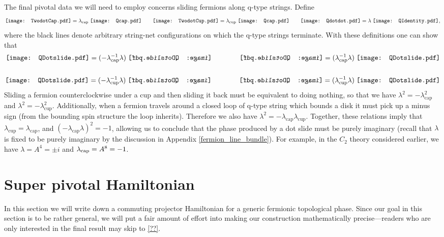 \documentclass[12pt,a4paper]{article}
\newcommand{\Qcap}{\mathord{\vcenter{\hbox{\texttt{[image: Qcap.pdf]}}}}}
\newcommand{\Qcup}{\mathord{\vcenter{\hbox{\texttt{[image: Qcap.pdf]}}}}}
\newcommand{\Qdotdot}{\mathord{\vcenter{\hbox{\texttt{[image: Qdotdot.pdf]}}}}}
\newcommand{\QIdentity}{\mathord{\vcenter{\hbox{\texttt{[image: QIdentity.pdf]}}}}}
\newcommand{\QCapDotL}{\mathord{\vcenter{\hbox{\texttt{[image: QDotslide.pdf]}}}}}
\newcommand{\QCupDotR}{\mathord{\vcenter{\hbox{\texttt{[image: QDotslide.pdf]}}}}}
\newcommand{\QCapDotR}{\mathord{\vcenter{\hbox{\reflectbox{\texttt{[image: QDotslide.pdf]}}}}}}
\newcommand{\QCupDotL}{\mathord{\vcenter{\hbox{\reflectbox{\texttt{[image: QDotslide.pdf]}}}}}}
\newcommand{\TwodotCap}{\mathord{\vcenter{\hbox{\texttt{[image: TwodotCap.pdf]}}}}}
\newcommand{\TwodotCup}{\mathord{\vcenter{\hbox{\texttt{[image: TwodotCup.pdf]}}}}}
\begin{document}
The final pivotal data we will need to employ concerns sliding fermions along q-type strings. 
Define 
\begin{align}
\TwodotCap =  \lambda_{\text{cap}} \; \Qcap \quad \quad
\TwodotCup =  \lambda_{\text{cup}}\; \Qcup \quad \quad
\Qdotdot =  \lambda \; \QIdentity,
\end{align}
where the black lines denote arbitrary string-net configurations on which the q-type strings terminate.
With these definitions one can show that
\begin{align}
\QCapDotL =(-\lambda_{\text{cap}}^{-1} \lambda )\; \QCapDotR \qquad \qquad \QCapDotR  = (\lambda_{\text{cap}}^{-1} \lambda ) \; \QCapDotL\\ 
\\
\QCupDotR= (-\lambda_{\text{cup}}^{-1} \lambda )\; \QCupDotL \qquad \qquad \QCupDotL  = (\lambda_{\text{cup}}^{-1} \lambda) \; \QCupDotR
\end{align}
Sliding a fermion counterclockwise under a cup and then sliding it back must be equivalent to doing nothing, so that we have $\lambda^2 = -\lambda_{\text{cap}}^2$ and $\lambda^2 = -\lambda_{\text{cup}}^2$.
Additionally, when a fermion travels around a closed loop of q-type string which bounds a disk it must pick up a minus sign (from the bounding spin structure the loop inherits). 
Therefore we also have $\lambda^2 = -\lambda_{\text{cap}} \lambda_{\text{cup}}$.
Together, these relations imply that $\lambda_{\text{cup}} = \lambda_{\text{cap}}$, and $(-\lambda_{\text{cap}} \lambda)^2 = -1$, allowing us to  
conclude that the phase produced by a dot slide must be purely imaginary (recall that 
$\lambda$ is fixed to be purely imaginary by the discussion in Appendix \ref{fermion_line_bundle}). 
For example, in the $C_2$ theory considered earlier, we have $\lambda = A^4 = \pm i$ and $\lambda_{\rm cap}=A^8=-1$. 





 \section{Super pivotal Hamiltonian}
 \label{Super_pivotal_Hamiltonian}

In this section we will write down a commuting projector Hamiltonian 
for a generic fermionic topological phase. 
Since our goal in this section is to be rather general, we will put a fair amount of effort into making our construction mathematically precise---readers who are only interested in the final result may skip to \ref{??}. 
\end{document}
